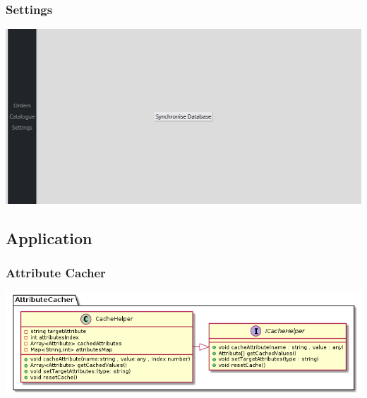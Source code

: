 \documentclass{article}
\begin{document}
\subsubsection{Settings}
\includegraphics[scale=0.25]{./out/ReactApp/Ui/Settings/Settings.png}

\newpage

\subsection{Application}
\subsubsection{Attribute Cacher}

\includegraphics[scale=0.5]{./out/ReactApp/Application/AttributeCacher/AttributeCacher.png}\\
\end{document}
